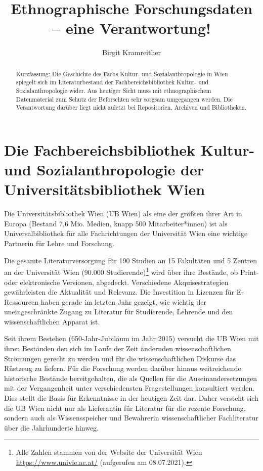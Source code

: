 \documentclass[a4paper,
fontsize=11pt,
oneside,
numbers=noperiodatend,
parskip=half-,
bibliography=totoc,
final
]{scrartcl}
\title{\LARGE{Ethnographische Forschungsdaten – eine Verantwortung!}}%
\author{Birgit Kramreither} %
\date{}
\begin{document}
\maketitle
\thispagestyle{fancyplain} 

\begin{abstract}
\noindent
Kurzfassung: Die Geschichte des Fachs Kultur- und Sozialanthropologie in
Wien spiegelt sich im Literaturbestand der Fachbereichsbibliothek
Kultur- und Sozialanthropologie wider. Aus heutiger Sicht muss mit
ethnographischem Datenmaterial zum Schutz der Beforschten sehr sorgsam
umgegangen werden. Die Verantwortung darüber liegt nicht zuletzt bei
Repositorien, Archiven und Bibliotheken.
\end{abstract}

\hypertarget{die-fachbereichsbibliothek-kultur--und-sozialanthropologie-der-universituxe4tsbibliothek-wien}{%
\section{Die Fachbereichsbibliothek Kultur- und
Sozialanthropologie der Universitätsbibliothek
Wien}\label{die-fachbereichsbibliothek-kultur--und-sozialanthropologie-der-universituxe4tsbibliothek-wien}}

Die Universitätsbibliothek Wien (UB Wien) als eine der größten ihrer Art
in Europa (Bestand 7,6 Mio. Medien, knapp 500 Mitarbeiter*innen) ist als
Universalbibliothek für alle Fachrichtungen der Universität Wien eine
wichtige Partnerin für Lehre und Forschung.

Die gesamte Literaturversorgung für 190 Studien an 15 Fakultäten und 5
Zentren an der Universität Wien (90.000 Studierende)\footnote{Alle
  Zahlen stammen von der Website der Universität Wien
  \url{https://www.univie.ac.at/} (aufgerufen am 08.07.2021).} wird über
ihre Bestände, ob Print- oder elektronische Versionen, abgedeckt.
Verschiedene Akquisestrategien gewährleisten die Aktualität und
Relevanz. Die Investition in Lizenzen für E-Ressourcen haben gerade im
letzten Jahr gezeigt, wie wichtig der uneingeschränkte Zugang zu
Literatur für Studierende, Lehrende und den wissenschaftlichen Apparat
ist.

Seit ihrem Bestehen (650-Jahr-Jubiläum im Jahr 2015) versucht die UB
Wien mit ihren Beständen den sich im Laufe der Zeit ändernden
wissenschaftlichen Strömungen gerecht zu werden und für die
wissenschaftlichen Diskurse das Rüstzeug zu liefern. Für die Forschung
werden darüber hinaus weitreichende historische Bestände bereitgehalten,
die als Quellen für die Auseinandersetzungen mit der Vergangenheit unter
verschiedensten Fragestellungen konsultiert werden. Dies stellt die
Basis für Erkenntnisse in der heutigen Zeit dar. Daher versteht sich die
UB Wien nicht nur als Lieferantin für Literatur für die rezente
Forschung, sondern auch als Wissensspeicher und Bewahrerin
wissenschaftlicher Fachliteratur über die Jahrhunderte hinweg.
\end{document}
